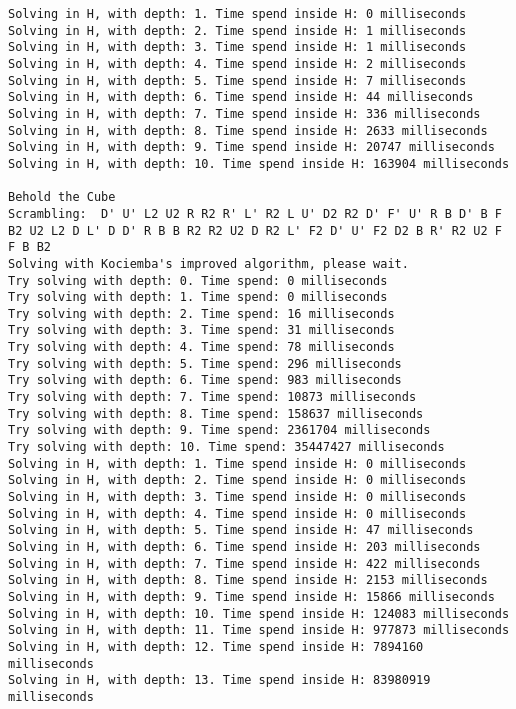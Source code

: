 \begin{lstlisting}[breaklines=true, basicstyle=\ttfamily\footnotesize]
Solving in H, with depth: 1. Time spend inside H: 0 milliseconds
Solving in H, with depth: 2. Time spend inside H: 1 milliseconds
Solving in H, with depth: 3. Time spend inside H: 1 milliseconds
Solving in H, with depth: 4. Time spend inside H: 2 milliseconds
Solving in H, with depth: 5. Time spend inside H: 7 milliseconds
Solving in H, with depth: 6. Time spend inside H: 44 milliseconds
Solving in H, with depth: 7. Time spend inside H: 336 milliseconds
Solving in H, with depth: 8. Time spend inside H: 2633 milliseconds
Solving in H, with depth: 9. Time spend inside H: 20747 milliseconds
Solving in H, with depth: 10. Time spend inside H: 163904 milliseconds

Behold the Cube
Scrambling:  D' U' L2 U2 R R2 R' L' R2 L U' D2 R2 D' F' U' R B D' B F B2 U2 L2 D L' D D' R B B R2 R2 U2 D R2 L' F2 D' U' F2 D2 B R' R2 U2 F F B B2
Solving with Kociemba's improved algorithm, please wait.
Try solving with depth: 0. Time spend: 0 milliseconds
Try solving with depth: 1. Time spend: 0 milliseconds
Try solving with depth: 2. Time spend: 16 milliseconds
Try solving with depth: 3. Time spend: 31 milliseconds
Try solving with depth: 4. Time spend: 78 milliseconds
Try solving with depth: 5. Time spend: 296 milliseconds
Try solving with depth: 6. Time spend: 983 milliseconds
Try solving with depth: 7. Time spend: 10873 milliseconds
Try solving with depth: 8. Time spend: 158637 milliseconds
Try solving with depth: 9. Time spend: 2361704 milliseconds
Try solving with depth: 10. Time spend: 35447427 milliseconds
Solving in H, with depth: 1. Time spend inside H: 0 milliseconds
Solving in H, with depth: 2. Time spend inside H: 0 milliseconds
Solving in H, with depth: 3. Time spend inside H: 0 milliseconds
Solving in H, with depth: 4. Time spend inside H: 0 milliseconds
Solving in H, with depth: 5. Time spend inside H: 47 milliseconds
Solving in H, with depth: 6. Time spend inside H: 203 milliseconds
Solving in H, with depth: 7. Time spend inside H: 422 milliseconds
Solving in H, with depth: 8. Time spend inside H: 2153 milliseconds
Solving in H, with depth: 9. Time spend inside H: 15866 milliseconds
Solving in H, with depth: 10. Time spend inside H: 124083 milliseconds
Solving in H, with depth: 11. Time spend inside H: 977873 milliseconds
Solving in H, with depth: 12. Time spend inside H: 7894160 milliseconds
Solving in H, with depth: 13. Time spend inside H: 83980919 milliseconds
\end{lstlisting}
